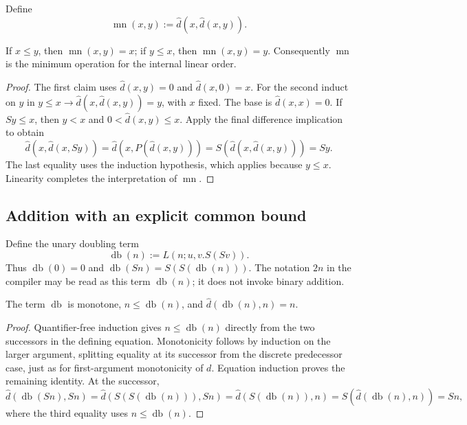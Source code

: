 Define
\[
                      \operatorname{mn}(x,y):=\widehat d(x,\widehat d(x,y)).
\]

\begin{lemma}[Minimum]
\label{lem:internal-minimum}
If $x\le y$, then $\operatorname{mn}(x,y)=x$; if $y\le x$, then $\operatorname{mn}(x,y)=y$.
Consequently $\operatorname{mn}$ is the minimum operation for the internal linear order.
\end{lemma}
\begin{proof}
The first claim uses $\widehat d(x,y)=0$ and $\widehat d(x,0)=x$.
For the second induct on $y$ in
$y\le x\to \widehat d(x,\widehat d(x,y))=y$, with $x$ fixed.
The base is $\widehat d(x,x)=0$.  If $Sy\le x$, then $y<x$ and
$0<\widehat d(x,y)\le x$.  Apply the final difference implication to obtain
\[
 \widehat d(x,\widehat d(x,Sy))
   =\widehat d(x,P(\widehat d(x,y)))
   =S(\widehat d(x,\widehat d(x,y)))=Sy.
\]
The last equality uses the induction hypothesis, which applies because
$y\le x$.  Linearity completes the interpretation of $\operatorname{mn}$.
\end{proof}

\subsection{Addition with an explicit common bound}

Define the unary doubling term
\[
             \operatorname{db}(n):=L(n;u,v.S(Sv)).
\]
Thus $\operatorname{db}(0)=0$ and $\operatorname{db}(Sn)=S(S(\operatorname{db}(n)))$.  The notation $2n$ in the compiler
may be read as this term $\operatorname{db}(n)$; it does not invoke binary addition.

\begin{lemma}
\label{lem:internal-doubling}
The term $\operatorname{db}$ is monotone, $n\le \operatorname{db}(n)$, and $\widehat d(\operatorname{db}(n),n)=n$.
\end{lemma}
\begin{proof}
Quantifier-free induction gives $n\le \operatorname{db}(n)$ directly from the two
successors in the defining equation.  Monotonicity follows by induction
on the larger argument, splitting equality at its successor from the
discrete predecessor case, just as for first-argument monotonicity of $d$.
Equation induction proves the remaining identity.  At the successor,
\[
 \widehat d(\operatorname{db}(Sn),Sn)
   =\widehat d(S(S(\operatorname{db}(n))),Sn)=\widehat d(S(\operatorname{db}(n)),n)
   =S(\widehat d(\operatorname{db}(n),n))=Sn,
\]
where the third equality uses $n\le \operatorname{db}(n)$.
\end{proof}

